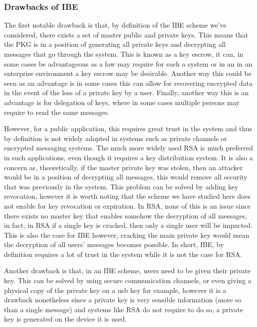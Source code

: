 \documentclass[conference]{IEEEtran}
\begin{document}
\subsubsection{Drawbacks of IBE}
The first notable drawback is that, by definition of the 
IBE scheme we've considered, there exists a set of master
public and private keys. This means that the PKG is in a position
of generating all private keys and decrypting all messages that go through 
the system. This is known as a key escrow, it can, in some cases
be advantageous as a law may require for such a system or in an 
in an enterprise environment a key escrow may be desirable. Another
way this could be seen as an advantage is in some cases this can allow 
for recovering encrypted data in the event of the loss of a private key by a user. 
Finally, another way this is an advantage is for delegation of keys, where in some 
cases multiple persons may require to read the same messages.


However, for a public application, this requires great trust in the system 
and thus by definition is not widely adopted in systems such as 
private channels or encrypted messaging systems. The much more 
widely used RSA is much preferred in such applications, even though it requires
a key distribution system.
It is also a concern as, theoretically, if the master private key was stolen,
then an attacker would be in a position of decrypting all messages, this 
would remove all security that was previously in the system. This problem
can be solved by adding key revocation, however it is worth noting that the 
scheme we have studied here does not enable for key revocation or expiration. 
In RSA, none of this is an issue since there exists no master key that enables 
somehow the decryption of all messages, in fact, in RSA if a single key is cracked,
then only a single user will be impacted. This is also the case for IBE however,
cracking the main private key would mean the decryption of all users' messages becomes possible.
In short, IBE, by definition requires a lot of trust in the system while it is not 
the case for RSA.


Another drawback is that, in an IBE scheme, users need to be given their private key.
This can be solved by using secure communication channels, or even giving a physical copy of the 
private key on a usb key for example, however it is a drawback nonetheless since 
a private key is very sensible information (more so than a single message) and systems 
like RSA do not require to do so, a private key is generated on the device it is used.
\end{document}
